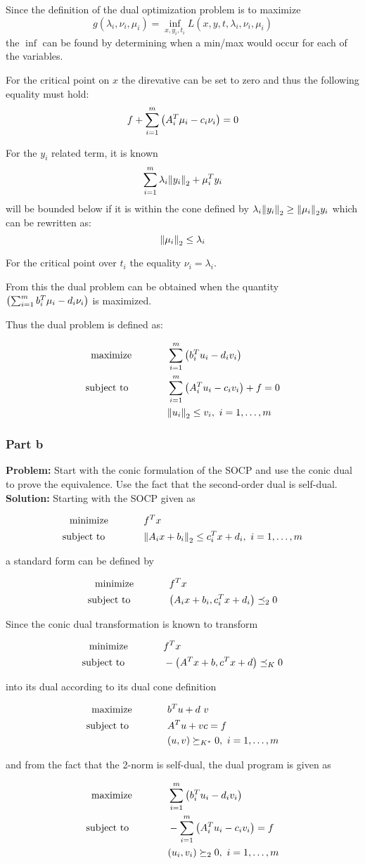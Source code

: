 \documentclass[letter]{article}
\newcommand{\optpblm}[3][eq:default]{
	\begin{equation}\label{#1}
		\begin{aligned}
			\text{minimize} \hspace{0.5in} &#2\vspace{5pt}\\
			\text{subject to \hspace{0.5in}} &#3
		\end{aligned}	
	\end{equation}
}
\newcommand{\maxpblm}[3][eq:default]{
	\begin{equation}\label{#1}
		\begin{aligned}
			\text{maximize} \hspace{0.5in} &#2\vspace{5pt}\\
			\text{subject to \hspace{0.5in}} &#3
		\end{aligned}	
	\end{equation}
}
\begin{document}
Since the definition of the dual optimization problem is to maximize $$g(\lambda_i, \nu_i, \mu_i) = \inf_{x,y_i,t_i} L(x,y,t, \lambda_i, \nu_i, \mu_i)$$ the $\inf$ can be found by determining when a min/max would occur for each of the variables.

For the critical point on $x$ the direvative can be set to zero and thus the following equality must hold:
\begin{equation}
	f + \sum_{i=1}^m \qty(A_i^T \mu_i - c_i \nu_i) = 0
\end{equation}

For the $y_i$ related term, it is known $$\sum_{i=1}^m \lambda_i \norm{y_i}_2 + \mu_i^T y_i$$ will be bounded below if it is within the cone defined by $\lambda_i \norm{y_i}_2 \geq \norm{\mu_i}_2 y_i$ which can be rewritten as: $$\norm{\mu_i}_2 \leq \lambda_i$$

For the critical point over $t_i$ the equality $\nu_i = \lambda_i$.

From this the dual problem can be obtained when the quantity $\qty(\sum_{i=1}^m b_i^T \mu_i - d_i \nu_i)$ is maximized.

Thus the dual problem is defined as:
\maxpblm{\sum_{i=1}^m \qty(b_i^T u_i - d_i v_i)}{
	\sum_{i=1}^m \qty(A_i^T u_i - c_i v_i) + f = 0\\
	& \norm{u_i}_2 \leq v_i, \ i = 1,\dots,m}

\newpage
\subsubsection{Part b}
\textbf{Problem:}
Start with the conic formulation of the SOCP and use the conic dual to prove the equivalence. Use the fact that the second-order dual is self-dual.\\

\noindent
\textbf{Solution:}
Starting with the SOCP given as
\optpblm{f^T x}{\norm{A_i x + b_i}_2 \leq c_i^T x + d_i, \ i = 1,\dots,m}

a standard form can be defined by
\optpblm{f^T x}{\qty(A_i x + b_i, c_i^T x + d_i) \preceq_{2} 0}


Since the conic dual transformation is known to transform
\optpblm{f^T x}{- \qty(A^T x + b, c^T x + d) \preceq_{K} 0}

into its dual according to its dual cone definition
\maxpblm{b^T u + d \ v}{A^T u + v c = f\\ &(u,v) \succeq_{K^*} 0, \ i = 1,\dots,m}

and from the fact that the 2-norm is self-dual, the dual program is given as
\maxpblm{\sum_{i=1}^m \qty(b_i^T u_i - d_i v_i)}{
	- \sum_{i=1}^m \qty(A_i^T u_i - c_i v_i) = f\\
	& (u_i, v_i) \succeq_{2} 0, \ i = 1,\dots,m}
\end{document}

